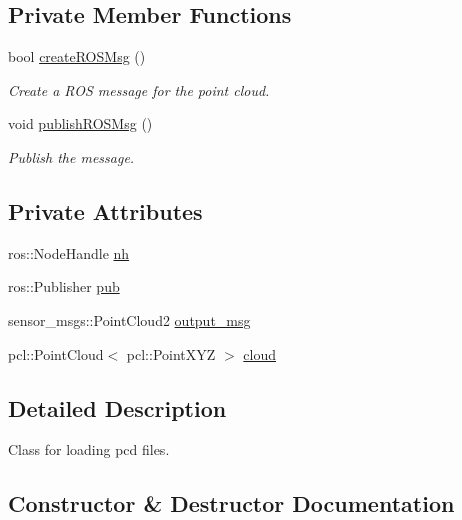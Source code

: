 \subsection*{Private Member Functions}
\begin{DoxyCompactItemize}
\item 
bool \hyperlink{classload__pcd_1_1_load_p_c_d_a0f1da0f53bc1ff4029cc3ce381520317}{create\+R\+O\+S\+Msg} ()
\begin{DoxyCompactList}\small\item\em Create a R\+OS message for the point cloud. \end{DoxyCompactList}\item 
void \hyperlink{classload__pcd_1_1_load_p_c_d_a00a28f5f0c461754e74f49bfdb9ff0b1}{publish\+R\+O\+S\+Msg} ()
\begin{DoxyCompactList}\small\item\em Publish the message. \end{DoxyCompactList}\end{DoxyCompactItemize}
\subsection*{Private Attributes}
\begin{DoxyCompactItemize}
\item 
ros\+::\+Node\+Handle \hyperlink{classload__pcd_1_1_load_p_c_d_a6e3e3bd9a8feea013787115296426d30}{nh}
\item 
ros\+::\+Publisher \hyperlink{classload__pcd_1_1_load_p_c_d_aa05fe1d30c2b35d0af4c3936b102bb59}{pub}
\item 
sensor\+\_\+msgs\+::\+Point\+Cloud2 \hyperlink{classload__pcd_1_1_load_p_c_d_a598d6d8452e88cfc42dbb9f383f2d63e}{output\+\_\+msg}
\item 
pcl\+::\+Point\+Cloud$<$ pcl\+::\+Point\+X\+YZ $>$ \hyperlink{classload__pcd_1_1_load_p_c_d_a3a00c45c42111b42373154c364950842}{cloud}
\end{DoxyCompactItemize}


\subsection{Detailed Description}
Class for loading pcd files. 

\subsection{Constructor \& Destructor Documentation}
